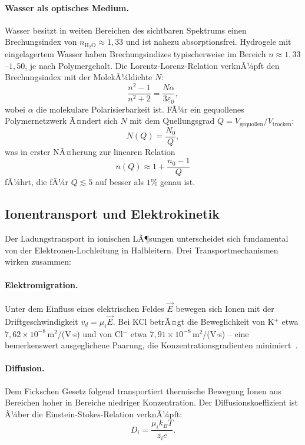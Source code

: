 ﻿\documentclass[a4paper,12pt]{scrreprt}
\theoremstyle{definition}
\begin{document}
\paragraph{Wasser als optisches Medium.}
Wasser besitzt in weiten Bereichen des sichtbaren Spektrums einen
Brechungsindex von $n_\text{H$_2$O} \approx 1{,}33$ und ist nahezu
absorptionsfrei. Hydrogele mit eingelagertem Wasser haben Brechungsindizes
typischerweise im Bereich $n \approx 1{,}33$--$1{,}50$, je nach Polymergehalt.
Die Lorentz-Lorenz-Relation verknÃ¼pft den Brechungsindex mit der
MolekÃ¼ldichte $N$:
\begin{equation}
  \frac{n^2 - 1}{n^2 + 2} = \frac{N \alpha}{3\varepsilon_0},
\end{equation}
wobei $\alpha$ die molekulare Polarisierbarkeit ist. FÃ¼r ein gequollenes
Polymernetzwerk Ã¤ndert sich $N$ mit dem Quellungsgrad $Q = V_\text{gequollen}/V_\text{trocken}$:
\begin{equation}
  N(Q) = \frac{N_0}{Q},
  \label{eq:dichte-quellung}
\end{equation}
was in erster NÃ¤herung zur linearen Relation
\begin{equation}
  n(Q) \approx 1 + \frac{n_0 - 1}{Q}
  \label{eq:n-quellung}
\end{equation}
fÃ¼hrt, die fÃ¼r $Q \lesssim 5$ auf besser als $1\%$ genau ist.

\subsection{Ionentransport und Elektrokinetik}

Der Ladungstransport in ionischen LÃ¶sungen unterscheidet sich fundamental
von der Elektronen-Lochleitung in Halbleitern. Drei Transportmechanismen
wirken zusammen:

\paragraph{Elektromigration.}
Unter dem Einfluss eines elektrischen Feldes $\vec{E}$ bewegen sich Ionen
mit der Driftgeschwindigkeit $v_d = \mu_i \vec{E}$. Bei KCl betrÃ¤gt die
Beweglichkeit von K$^+$ etwa $7{,}62 \times 10^{-8}$\,m$^2$/(V$\cdot$s)
und von Cl$^-$ etwa $7{,}91 \times 10^{-8}$\,m$^2$/(V$\cdot$s) -- eine
bemerkenswert ausgeglichene Paarung, die Konzentrationsgradienten
minimiert~\cite{atkins2018}.

\paragraph{Diffusion.}
Dem Fickschen Gesetz folgend transportiert thermische Bewegung Ionen aus
Bereichen hoher in Bereiche niedriger Konzentration. Der Diffusionskoeffizient
ist Ã¼ber die Einstein-Stokes-Relation verknÃ¼pft:
\begin{equation}
  D_i = \frac{\mu_i k_B T}{z_i e}.
  \label{eq:einstein_stokes}
\end{equation}
\end{document}
